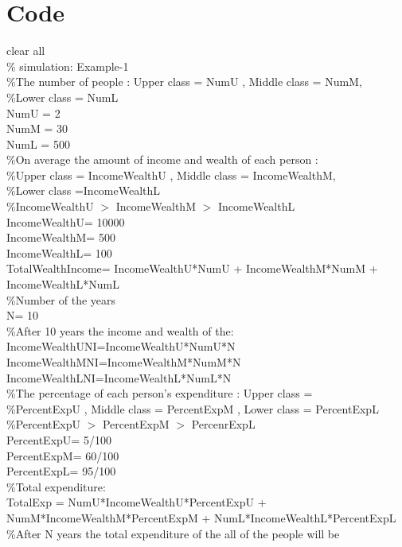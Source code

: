 \documentclass[12pt,a4paper]{article}
\begin{document}
  \section{Code}
  clear all
\\\% simulation: Example-1
\\ \%The number of people : Upper  class = NumU , Middle class = NumM, 
\\ \%Lower  class = NumL 
\\NumU = 2
\\NumM = 30
\\NumL = 500
\medskip 
\\ \%On average the amount of income and wealth of each person :   
\\ \%Upper class = IncomeWealthU , Middle class = IncomeWealthM,    
\\ \%Lower class =IncomeWealthL 
\\ \%IncomeWealthU $>$ IncomeWealthM $>$ IncomeWealthL 
\medskip 
\\ IncomeWealthU= 10000
\\ IncomeWealthM= 500
\\ IncomeWealthL= 100
\medskip
\\ TotalWealthIncome= IncomeWealthU*NumU + IncomeWealthM*NumM + IncomeWealthL*NumL
\medskip
\\ \%Number of the years
\\ N= 10
\\ \%After 10 years the income and wealth of the:
\\ IncomeWealthUNI=IncomeWealthU*NumU*N
\\ IncomeWealthMNI=IncomeWealthM*NumM*N
\\ IncomeWealthLNI=IncomeWealthL*NumL*N
\\ \%The percentage of each person's expenditure  : Upper  class = 
\\ \%PercentExpU  , Middle class = PercentExpM , Lower  class = PercentExpL  
\\ \%PercentExpU $>$ PercentExpM $>$ PercenrExpL
\medskip
\\ PercentExpU= 5/100 
\\ PercentExpM= 60/100 
\\ PercentExpL= 95/100
\medskip
\\ \%Total expenditure:
\\ TotalExp = NumU*IncomeWealthU*PercentExpU + NumM*IncomeWealthM*PercentExpM + NumL*IncomeWealthL*PercentExpL
\medskip
\\ \%After N years the total expenditure of the all of the people will be
\end{document}
